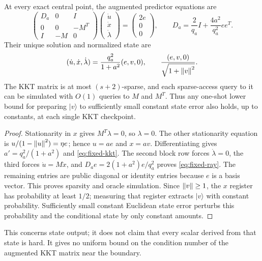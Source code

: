 \begin{proposition}\label{prop:fixed-kkt}
At every exact central point, the augmented predictor equations are
\begin{equation}\label{eq:fixed-kkt}
 \begin{pmatrix}
 D_a&0&I\\0&0&-M^T\\I&-M&0
 \end{pmatrix}
 \begin{pmatrix}\dot u\\\dot x\\\dot\lambda\end{pmatrix}
 =\begin{pmatrix}2e\\0\\0\end{pmatrix},
 \qquad D_a=\frac2{q_a}I+\frac{4a^2}{q_a^2}ee^T.
\end{equation}
Their unique solution and normalized state are
\begin{equation}\label{eq:fixed-ray}
 (\dot u,\dot x,\dot\lambda)
 =\frac{q_a^2}{1+a^2}(e,v,0),\qquad
 \frac{(e,v,0)}{\sqrt{1+\left\lVert v\right\rVert^2}}.
\end{equation}
The KKT matrix is at most $(s+2)$-sparse, and each sparse-access query to
it can be simulated with $O(1)$ queries to $M$ and $M^T$.  Thus any
one-shot lower bound for preparing $|v\rangle$ to sufficiently small
constant state error also holds, up to constants, at each single KKT
checkpoint.
\end{proposition}
\begin{proof}
Stationarity in $x$ gives $M^T\lambda=0$, so $\lambda=0$.
The other stationarity equation is $u/(1-\left\lVert u\right\rVert^2)=\eta e$;
hence $u=ae$ and $x=av$.  Differentiating gives
$a'=q_a^2/(1+a^2)$ and \eqref{eq:fixed-kkt}.
The second block row forces $\dot\lambda=0$, the third forces
$\dot u=M\dot x$, and $D_ae=2(1+a^2)e/q_a^2$ proves
\eqref{eq:fixed-ray}.  The remaining entries are public diagonal or
identity entries because $e$ is a basis vector.  This proves sparsity and
oracle simulation.  Since $\left\lVert v\right\rVert\geq1$, the $x$ register has probability
at least $1/2$; measuring that register extracts $|v\rangle$ with constant
probability.  Sufficiently small constant Euclidean state error perturbs
this probability and the conditional state by only constant amounts.
\end{proof}

This concerns state output; it does not claim that every scalar derived
from that state is hard.  It gives no uniform bound on the
condition number of the augmented KKT matrix near the boundary.

